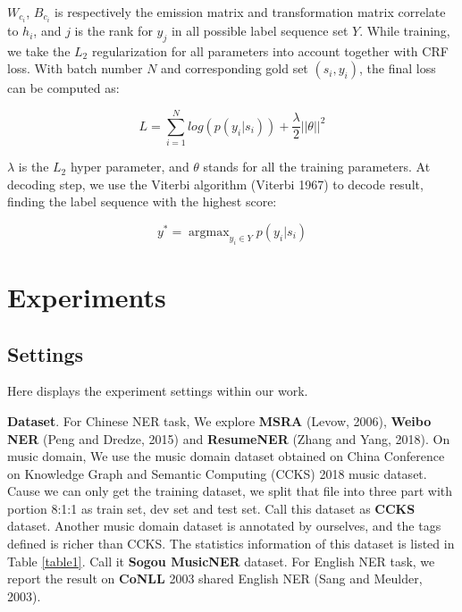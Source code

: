 \documentclass[letterpaper]{article} %
\begin{document}
$W_{c_i}$, $B_{c_i}$ is respectively the emission matrix and transformation matrix correlate to $h_i$, and $j$ is the rank for $y_j$ in all possible label sequence set $Y$.  While training, we take the $L_2$ regularization for all parameters into account together with CRF loss. With batch number $N$ and corresponding gold set $(s_i, y_i)$, the final loss can be computed as:

\begin{equation}
L = \sum_{i=1}^{N}{log(p(y_i | s_i))} + \frac{\lambda}{2}{|| \theta ||}^2
\label{crf_probability}
\end{equation}

$\lambda$ is the $L_2$ hyper parameter, and $\theta$ stands for all the training parameters. At decoding step, we use the Viterbi algorithm (Viterbi 1967) to decode result, finding the label sequence with the highest score: 

\begin{equation}
y^* = \mathop{\arg\max}_{y_i \in Y}{p(y_i | s_i)}
\label{crf_decode}
\end{equation}

\begin{table}[t]
\caption{Statistics of Sogou MusicNER dataset.}\smallskip
\centering
{}
\label{table1}
\end{table}

\section{Experiments}

\subsection{Settings}

Here displays the experiment settings within our work.

\textbf{Dataset}. For Chinese NER task, We explore \textbf{MSRA} (Levow, 2006), \textbf{Weibo NER} (Peng and Dredze, 2015) and \textbf{ResumeNER} (Zhang and Yang, 2018). On music domain, We use the music domain dataset obtained on China Conference on Knowledge Graph and Semantic Computing (CCKS) 2018 music dataset. Cause we can only get the training dataset,  we split that file into three part with portion 8:1:1 as train set, dev set and test set. Call this dataset as \textbf{CCKS} dataset. Another music domain dataset is annotated by ourselves, and the tags defined is richer than CCKS. The statistics information of this dataset is listed in Table \ref{table1}. Call it \textbf{Sogou MusicNER} dataset. For English NER task, we report the result on \textbf{CoNLL} 2003 shared English NER (Sang and Meulder, 2003).
\end{document}
